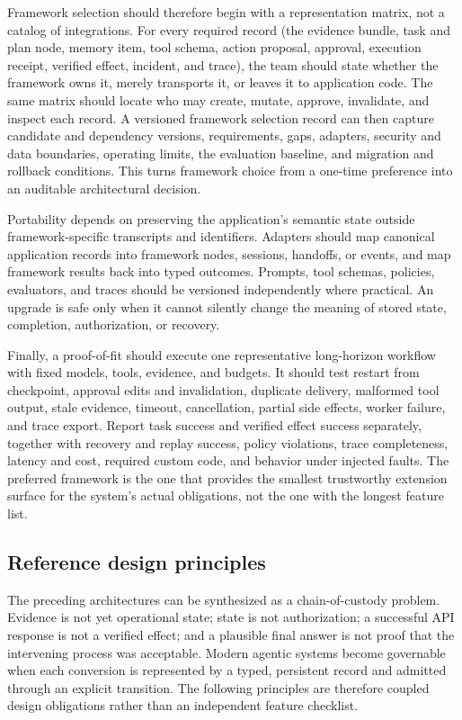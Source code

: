 Framework selection should therefore begin with a representation matrix, not a catalog of integrations. For every required record (the evidence bundle, task and plan node, memory item, tool schema, action proposal, approval, execution receipt, verified effect, incident, and trace), the team should state whether the framework owns it, merely transports it, or leaves it to application code. The same matrix should locate who may create, mutate, approve, invalidate, and inspect each record. A versioned framework selection record can then capture candidate and dependency versions, requirements, gaps, adapters, security and data boundaries, operating limits, the evaluation baseline, and migration and rollback conditions. This turns framework choice from a one-time preference into an auditable architectural decision.

Portability depends on preserving the application's semantic state outside framework-specific transcripts and identifiers. Adapters should map canonical application records into framework nodes, sessions, handoffs, or events, and map framework results back into typed outcomes. Prompts, tool schemas, policies, evaluators, and traces should be versioned independently where practical. An upgrade is safe only when it cannot silently change the meaning of stored state, completion, authorization, or recovery.

Finally, a proof-of-fit should execute one representative long-horizon workflow with fixed models, tools, evidence, and budgets. It should test restart from checkpoint, approval edits and invalidation, duplicate delivery, malformed tool output, stale evidence, timeout, cancellation, partial side effects, worker failure, and trace export. Report task success and verified effect success separately, together with recovery and replay success, policy violations, trace completeness, latency and cost, required custom code, and behavior under injected faults. The preferred framework is the one that provides the smallest trustworthy extension surface for the system's actual obligations, not the one with the longest feature list.

\subsection{Reference design principles}

The preceding architectures can be synthesized as a chain-of-custody problem. Evidence is not yet operational state; state is not authorization; a successful API response is not a verified effect; and a plausible final answer is not proof that the intervening process was acceptable. Modern agentic systems become governable when each conversion is represented by a typed, persistent record and admitted through an explicit transition. The following principles are therefore coupled design obligations rather than an independent feature checklist.

